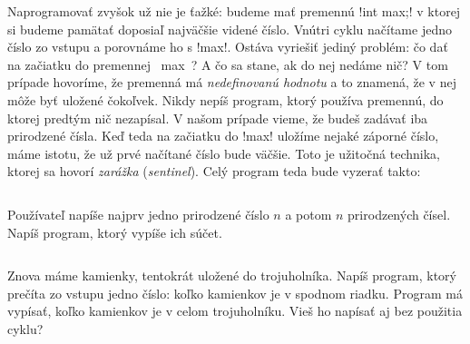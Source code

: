 \begin{column}{0.6}
Naprogramovať zvyšok už nie je ťažké: budeme mať premennú \prg!int max;!
v ktorej si budeme pamätať doposiaľ najväčšie videné číslo. Vnútri cyklu načítame
jedno číslo zo vstupu a porovnáme ho s \prg!max!. Ostáva vyriešiť jediný problém:
čo dať na začiatku do premennej \prg~max~? A čo sa stane, ak do nej nedáme nič?
V tom prípade hovoríme, že premenná má {\em nedefinovanú hodnotu} a to znamená, že 
v nej môže byť uložené čokoľvek. Nikdy nepíš program, ktorý používa premennú, do ktorej
predtým nič nezapísal. V našom prípade vieme, že budeš zadávať iba prirodzené čísla.
Keď teda na začiatku do \prg!max! uložíme nejaké záporné číslo, máme istotu,
že už prvé načítané číslo bude väčšie. 
Toto je užitočná technika, ktorej sa hovorí 
{\em zarážka} ({\em sentinel}). 
Celý program teda bude vyzerať takto:
\end{column}
\hfill
{}

\begin{uloha}
  Používateľ napíše najprv jedno prirodzené číslo $n$
a potom $n$ prirodzených čísel. Napíš program, ktorý vypíše ich súčet.
\end{uloha}

\begin{column}{0.7}
\begin{uloha}
  Znova máme kamienky, tentokrát uložené do trojuholníka.
  Napíš program, ktorý prečíta zo vstupu jedno číslo: koľko kamienkov je v 
  spodnom riadku.
  Program má vypísať, koľko kamienkov je v celom trojuholníku. Vieš ho napísať aj bez 
  použitia cyklu?
\end{uloha}
\end{column}

